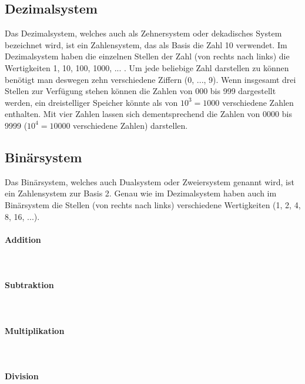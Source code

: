 \documentclass[a4paper,10pt]{article}
\begin{document}
  \subsection{Dezimalsystem}
  Das Dezimalsystem, welches auch als Zehnersystem oder dekadisches System bezeichnet
  wird, ist ein Zahlensystem, das als Basis die Zahl 10 verwendet. Im Dezimalsystem
  haben die einzelnen Stellen der Zahl (von rechts nach links) die Wertigkeiten
  1, 10, 100, 1000, ... . Um jede beliebige Zahl darstellen zu können benötigt
  man deswegen zehn verschiedene Ziffern (0, ..., 9). Wenn insgesamt drei Stellen
  zur Verfügung stehen können die Zahlen von 000 bis 999 dargestellt werden, ein
  dreistelliger \glqq Speicher \grqq{} könnte als von $10^3 = 1000$ verschiedene
  Zahlen enthalten. Mit vier Zahlen lassen sich dementsprechend die Zahlen von
  0000 bis 9999 ($10^4 = 10000$ verschiedene Zahlen) darstellen.

  \subsection{Binärsystem}
  Das Binärsystem, welches auch Dualsystem oder Zweiersystem genannt wird, ist
  ein Zahlensystem zur Basis 2. Genau wie im Dezimalsystem haben auch im Binärsystem
  die Stellen (von rechts nach links) verschiedene Wertigkeiten (1, 2, 4, 8, 16,
  ...). 

  \paragraph{Addition}\mbox{}\\
  \paragraph{Subtraktion}\mbox{}\\
  \paragraph{Multiplikation}\mbox{}\\
  \paragraph{Division}\mbox{}\\
\end{document}
